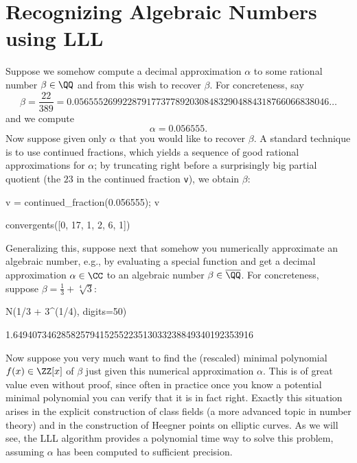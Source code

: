 \section{Recognizing Algebraic Numbers using LLL}\label{sec:LLL}

Suppose we somehow compute a decimal approximation $\alpha$
to some rational number $\beta \in \QQ$ and from this wish
to recover $\beta$.  For concreteness, say
$$
  \beta = \frac{22}{389} =
  0.05655526992287917737789203
  084832904884318766066838046
  \dots
$$
and we compute
$$
  \alpha = 0.056555.
$$
Now suppose given only $\alpha$ that you would like to recover
$\beta$.  A standard technique is to use continued fractions, which
yields a sequence of good rational approximations
for $\alpha$; by truncating right before a surprisingly big
partial quotient (the $23$ in the continued fraction {\tt v}),
we obtain $\beta$:
\begin{sagecode}
\begin{sagecell}
v = continued_fraction(0.056555); v
\end{sagecell}
\begin{sageout}
[0, 17, 1, 2, 6, 1, 23, 1, 1, 1, 1, 1, 2]
\end{sageout}
\begin{sagecell}
convergents([0, 17, 1, 2, 6, 1])
\end{sagecell}
\begin{sageout}
[0, 1/17, 1/18, 3/53, 19/336, 22/389]
\end{sageout}
\end{sagecode}

Generalizing this, suppose next that somehow you numerically approximate
an algebraic number, e.g., by evaluating a special
function and get a decimal approximation $\alpha \in \CC$
to an algebraic number $\beta \in \overline{\QQ}$.  For concreteness,
suppose $\beta = \frac{1}{3} + \sqrt[4]{3}$:
\begin{sagecode}
\begin{sagecell}
N(1/3 + 3^(1/4), digits=50)
\end{sagecell}
\begin{sageout}
1.64940734628582579415255223513033238849340192353916
\end{sageout}
\end{sagecode}
Now suppose you very much want to find the (rescaled)
minimal polynomial $f(x) \in \ZZ[x]$
of $\beta$ just given this numerical approximation $\alpha$.
This is of great value even without proof, since often in practice
once you know a potential minimal polynomial you can
verify that it is in fact right.  Exactly this situation
arises in the explicit construction of class fields (a
more advanced topic in number theory) and in the construction
of Heegner points on elliptic curves.   As we will see, the
LLL algorithm provides a polynomial time way to solve this
problem, assuming $\alpha$ has been computed to
sufficient precision.

